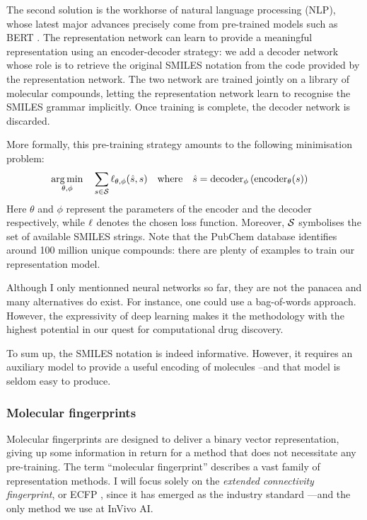 \documentclass[11pt]{article}
\numberwithin{equation}{subsection}
\begin{document}
The second solution is the workhorse of natural language processing (NLP), whose latest major advances precisely come from pre-trained models such as BERT \citep{devlin2018bert}. The representation network can learn to provide a meaningful representation using an encoder-decoder strategy: we add a decoder network whose role is to retrieve the original SMILES notation from the code provided by the representation network. The two network are trained jointly on a library of molecular compounds, letting the representation network learn to recognise the SMILES grammar implicitly. Once training is complete, the decoder network is discarded.

More formally, this pre-training strategy amounts to the following minimisation problem:
\begin{align}
  \operatorname*{arg\,min}_{\theta, \phi} \quad \sum_{s \in {\mathcal{S}}} \ell_{\theta, \phi} (\hat{s}, s) &&
  \text{where} \quad \hat{s} & =\text{decoder}_{\phi} \left( \text{encoder}_\theta(s) \right)
\end{align}
Here $\theta$ and $\phi$ represent the parameters of the encoder and the decoder respectively, while $\ell$ denotes the chosen loss function. Moreover, ${\mathcal{S}}$ symbolises the set of available SMILES strings. Note that the PubChem database identifies around 100 million unique compounds: there are plenty of examples to train our representation model.

Although I only mentionned neural networks so far, they are not the panacea and many alternatives do exist. For instance, one could use a bag-of-words approach. However, the expressivity of deep learning makes it the methodology with the highest potential in our quest for computational drug discovery.

To sum up, the SMILES notation is indeed informative. However, it requires an auxiliary model to provide a useful encoding of molecules --and that model is seldom easy to produce.



\subsubsection{Molecular fingerprints}
\label{sec:fingerprints}

Molecular fingerprints are designed to deliver a binary vector representation, giving up some information in return for a method that does not necessitate any pre-training.
The term ``molecular fingerprint'' describes a vast family of representation methods. I will focus solely on the \textit{extended connectivity fingerprint}, or ECFP \citep{ecfp}, since it has emerged as the industry standard ---and the only method we use at InVivo AI.
\end{document}

